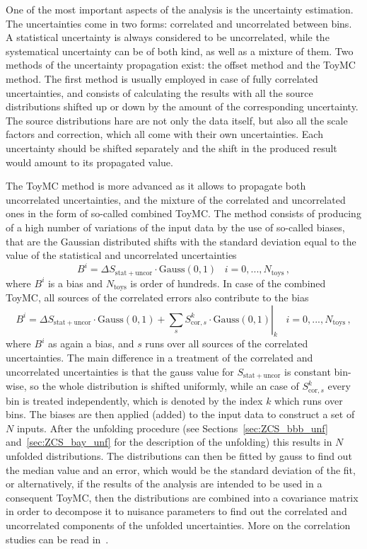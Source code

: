 One of the most important aspects of the analysis is the uncertainty estimation. The uncertainties come in two forms: correlated and uncorrelated between bins. A statistical uncertainty is always considered to be uncorrelated, while the systematical uncertainty can be of both kind, as well as a mixture of them. Two methods of the uncertainty propagation exist: the offset method and the ToyMC method. The first method is usually employed in case of fully correlated uncertainties, and consists of calculating the results with all the source distributions shifted up or down by the amount of the corresponding uncertainty. The source distributions hare are not only the data itself, but also all the scale factors and correction, which all come with their own uncertainties. Each uncertainty should be shifted separately and the shift in the produced result would amount to its propagated value.

The ToyMC method is more advanced as it allows to propagate both uncorrelated uncertainties, and the mixture of the correlated and uncorrelated ones in the form of so-called combined ToyMC. The method consists of producing of a high number of variations of the input data by the use of so-called biases, that are the Gaussian distributed shifts with the standard deviation equal to the value of the statistical and uncorrelated uncertainties
\begin{equation}
B^i = \Delta S_\mathrm{stat+uncor} \cdot \mathrm{Gauss}(0,1)\;\;\; i=0,...,N_\mathrm{toys}\,,
\end{equation}
where $B^i$ is a bias and $N_\mathrm{toys}$ is order of hundreds. In case of the combined ToyMC, all sources of the correlated errors also contribute to the bias
\begin{equation}
\left. B^i = \Delta S_\mathrm{stat+uncor} \cdot \mathrm{Gauss}(0,1) + \sum\limits_{s}S^k_{\mathrm{cor},s} \cdot \mathrm{Gauss}(0,1)\right\vert_k \;\;\; i=0,...,N_\mathrm{toys}\,,
\end{equation}
where $B^i$ as again a bias, and $s$ runs over all sources of the correlated uncertainties. The main difference in a treatment of the correlated and uncorrelated uncertainties is that the gauss value for $S_\mathrm{stat+uncor}$ is constant bin-wise, so the whole distribution is shifted uniformly, while an case of $S^k_{\mathrm{cor},s}$ every bin is treated independently, which is denoted by the index $k$ which runs over bins. The biases are then applied (added) to the input data to construct a set of $N$ inputs. After the unfolding procedure (see Sections~\ref{sec:ZCS_bbb_unf} and~\ref{sec:ZCS_bay_unf} for the description of the unfolding) this results in $N$ unfolded distributions. The distributions can then be fitted by gauss to find out the median value and an error, which would be the standard deviation of the fit, or alternatively, if the results of the analysis are intended to be used in a consequent ToyMC, then the distributions are combined into a covariance matrix in order to decompose it to nuisance parameters to find out the correlated and uncorrelated components of the unfolded uncertainties. More on the correlation studies can be read in~\cite{lib:elec_support}.

